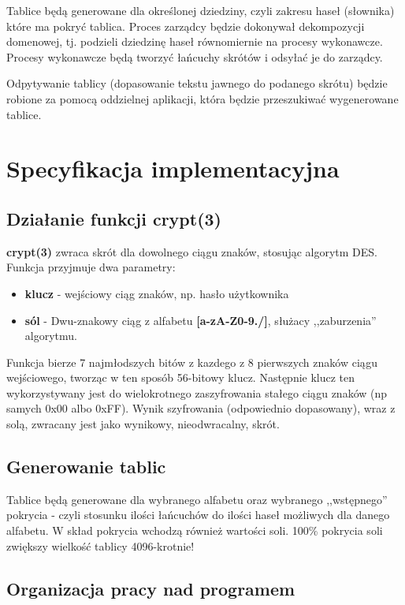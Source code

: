 \documentclass[a4paper,11pt]{article}
\begin{document}
Tablice będą generowane dla określonej dziedziny, czyli zakresu haseł (słownika) które ma pokryć tablica. Proces zarządcy będzie dokonywał dekompozycji domenowej, tj. podzieli dziedzinę haseł równomiernie na procesy wykonawcze. Procesy wykonawcze będą tworzyć łańcuchy skrótów i odsyłać je do zarządcy.

Odpytywanie tablicy (dopasowanie tekstu jawnego do podanego skrótu) będzie robione za pomocą oddzielnej aplikacji, która będzie przeszukiwać wygenerowane tablice.

\section{Specyfikacja implementacyjna}

\subsection{Działanie funkcji crypt(3)}

\textbf{crypt(3)} zwraca skrót dla dowolnego ciągu znaków, stosując algorytm DES. Funkcja przyjmuje dwa parametry:
\begin{itemize}
	\item \textbf{klucz} - wejściowy ciąg znaków, np. hasło użytkownika
	\item \textbf{sól} - Dwu-znakowy ciąg z alfabetu \textbf{[a-zA-Z0-9./]}, służacy ,,zaburzenia'' algorytmu.
\end{itemize}

Funkcja bierze 7 najmłodszych bitów z kazdego z 8 pierwszych znaków ciągu wejściowego, tworząc w ten sposób 56-bitowy klucz. Następnie klucz ten wykorzystywany jest do wielokrotnego zaszyfrowania stałego ciągu znaków (np samych 0x00 albo 0xFF). Wynik szyfrowania (odpowiednio dopasowany), wraz z solą, zwracany jest jako wynikowy, nieodwracalny, skrót.

\subsection{Generowanie tablic}

Tablice będą generowane dla wybranego alfabetu oraz wybranego ,,wstępnego'' pokrycia - czyli stosunku ilości łańcuchów do ilości haseł możliwych dla danego alfabetu. W skład pokrycia wchodzą również wartości soli. 100\% pokrycia soli zwiększy wielkość tablicy 4096-krotnie!

\subsection{Organizacja pracy nad programem}
\end{document}
